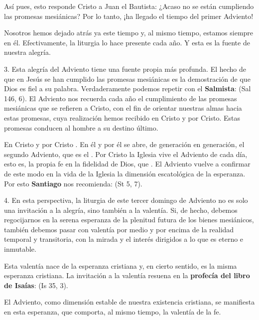 \begin{body}
						Así pues, esto responde Cristo a Juan el Bautista: ¿Acaso no se están cumpliendo las promesas mesiánicas? Por lo tanto, ¡ha llegado el tiempo del primer Adviento!
						
						Nosotros hemos dejado atrás ya este tiempo y, al mismo tiempo, estamos siempre en él. Efectivamente, la liturgia lo hace presente cada año. Y esta es la fuente de nuestra alegría.
						
						3. Esta alegría del Adviento tiene una fuente propia más profunda. El hecho de que en Jesús se han cumplido las promesas mesiánicas es la demostración de que Dios es fiel a su palabra. Verdaderamente podemos repetir con el \textbf{Salmista}:  (Sal 146, 6). El Adviento nos recuerda cada año el cumplimiento de las promesas mesiánicas que se refieren a Cristo, con el fin de orientar nuestras almas hacia estas promesas, cuya realización hemos recibido en Cristo y por Cristo. Estas promesas conducen al hombre a su destino último.
						
						En Cristo y por Cristo . En él y por él se abre, de generación en generación, el segundo Adviento, que es el . Por Cristo la Iglesia vive el Adviento de cada día, esto es, la propia fe en la fidelidad de Dios, que . El Adviento vuelve a confirmar de este modo en la vida de la Iglesia la dimensión escatológica de la esperanza. Por esto \textbf{Santiago} nos recomienda:  (St 5, 7).
						
						4. En esta perspectiva, la liturgia de este tercer domingo de Adviento no es solo una invitación a la alegría, sino también a la valentía. Si, de hecho, debemos regocijarnos en la serena esperanza de la plenitud futura de los bienes mesiánicos, también debemos pasar con valentía por medio y por encima de la realidad temporal y transitoria, con la mirada y el interés dirigidos a lo que es eterno e inmutable.
						
						Esta valentía nace de la esperanza cristiana y, en cierto sentido, es la misma esperanza cristiana. La invitación a la valentía resuena en la \textbf{profecía del libro de Isaías}:  (Is 35, 3).
						
						El Adviento, como dimensión estable de nuestra existencia cristiana, se manifiesta en esta esperanza, que comporta, al mismo tiempo, la valentía  de la fe.
						

\end{body}
